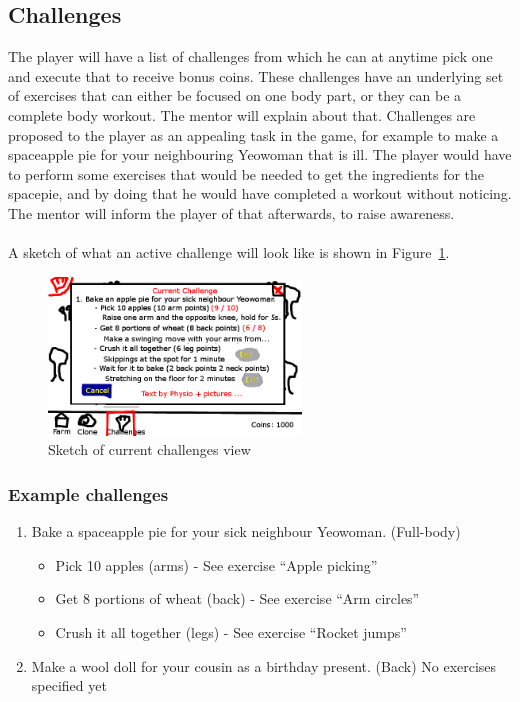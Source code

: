 \documentclass[a4paper,11pt,notitlepage]{report}
\begin{document}
\subsection{Challenges}
The player will have a list of challenges from which he can at anytime pick one and execute that to receive bonus coins. These challenges have an underlying set of exercises that can either be focused on one body part, or they can be a complete body workout. The mentor will explain about that. Challenges are proposed to the player as an appealing task in the game, for example to make a spaceapple pie for your neighbouring Yeowoman that is ill. The player would have to perform some exercises that would be needed to get the ingredients for the spacepie, and by doing that he would have completed a workout without noticing. The mentor will inform the player of that afterwards, to raise awareness.
\\\\
A sketch of what an active challenge will look like is shown in Figure~\ref{fig:sketch-challenge}.

\begin{figure}[h]
	\centering
		\includegraphics[width=0.60\textwidth]{Images/sketch-challenge.png}
	\caption{Sketch of current challenges view}
	\label{fig:sketch-challenge}
\end{figure}

\subsubsection{Example challenges}
\begin{enumerate}
\item Bake a spaceapple pie for your sick neighbour Yeowoman. (Full-body)
\begin{itemize}
\item Pick 10 apples (arms) - See exercise “Apple picking”
\item Get 8 portions of wheat (back) - See exercise “Arm circles”
\item Crush it all together (legs) - See exercise “Rocket jumps”
\end{itemize}
\item Make a wool doll for your cousin as a birthday present. (Back)
No exercises specified yet
\end{enumerate}
\end{document}
